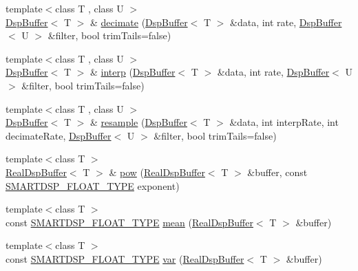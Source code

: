 \begin{DoxyCompactItemize}
\item 
{\footnotesize template$<$class T , class U $>$ }\\\hyperlink{class_smart_dsp_1_1_dsp_buffer}{Dsp\+Buffer}$<$ T $>$ \& \hyperlink{namespace_smart_dsp_a3737beac2fd084febc0156cb6a9f4102}{decimate} (\hyperlink{class_smart_dsp_1_1_dsp_buffer}{Dsp\+Buffer}$<$ T $>$ \&data, int rate, \hyperlink{class_smart_dsp_1_1_dsp_buffer}{Dsp\+Buffer}$<$ U $>$ \&filter, bool trim\+Tails=false)
\item 
{\footnotesize template$<$class T , class U $>$ }\\\hyperlink{class_smart_dsp_1_1_dsp_buffer}{Dsp\+Buffer}$<$ T $>$ \& \hyperlink{namespace_smart_dsp_a9e1c15274538497995e031625288a0ee}{interp} (\hyperlink{class_smart_dsp_1_1_dsp_buffer}{Dsp\+Buffer}$<$ T $>$ \&data, int rate, \hyperlink{class_smart_dsp_1_1_dsp_buffer}{Dsp\+Buffer}$<$ U $>$ \&filter, bool trim\+Tails=false)
\item 
{\footnotesize template$<$class T , class U $>$ }\\\hyperlink{class_smart_dsp_1_1_dsp_buffer}{Dsp\+Buffer}$<$ T $>$ \& \hyperlink{namespace_smart_dsp_abcbe35e45c92d00de80c43f0fb5458ef}{resample} (\hyperlink{class_smart_dsp_1_1_dsp_buffer}{Dsp\+Buffer}$<$ T $>$ \&data, int interp\+Rate, int decimate\+Rate, \hyperlink{class_smart_dsp_1_1_dsp_buffer}{Dsp\+Buffer}$<$ U $>$ \&filter, bool trim\+Tails=false)
\item 
{\footnotesize template$<$class T $>$ }\\\hyperlink{class_smart_dsp_1_1_real_dsp_buffer}{Real\+Dsp\+Buffer}$<$ T $>$ \& \hyperlink{namespace_smart_dsp_a3a7ada3d4ac8701594d94073fd25a920}{pow} (\hyperlink{class_smart_dsp_1_1_real_dsp_buffer}{Real\+Dsp\+Buffer}$<$ T $>$ \&buffer, const \hyperlink{_dsp_buffer_8h_a9ed4123d332590f7a6161bc2061eac49}{S\+M\+A\+R\+T\+D\+S\+P\+\_\+\+F\+L\+O\+A\+T\+\_\+\+T\+Y\+P\+E} exponent)
\item 
{\footnotesize template$<$class T $>$ }\\const \hyperlink{_dsp_buffer_8h_a9ed4123d332590f7a6161bc2061eac49}{S\+M\+A\+R\+T\+D\+S\+P\+\_\+\+F\+L\+O\+A\+T\+\_\+\+T\+Y\+P\+E} \hyperlink{namespace_smart_dsp_a900a7e8c25f61af8bf074f20ec6518cd}{mean} (\hyperlink{class_smart_dsp_1_1_real_dsp_buffer}{Real\+Dsp\+Buffer}$<$ T $>$ \&buffer)
\item 
{\footnotesize template$<$class T $>$ }\\const \hyperlink{_dsp_buffer_8h_a9ed4123d332590f7a6161bc2061eac49}{S\+M\+A\+R\+T\+D\+S\+P\+\_\+\+F\+L\+O\+A\+T\+\_\+\+T\+Y\+P\+E} \hyperlink{namespace_smart_dsp_afe6e2c7d9a8268fb0e31e7060a206bd7}{var} (\hyperlink{class_smart_dsp_1_1_real_dsp_buffer}{Real\+Dsp\+Buffer}$<$ T $>$ \&buffer)

\end{DoxyCompactItemize}

